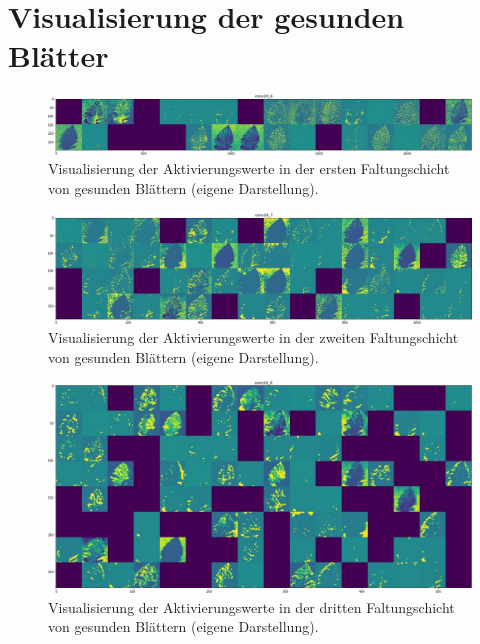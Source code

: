 \chapter{Visualisierung der gesunden Blätter}
\label{anahnga}


\begin{figure}[h!]
	\centering
	\includegraphics[width=\textwidth]{visualisierungen/healthy/activation/healthy0.JPG}
	\caption{Visualisierung der Aktivierungswerte in der ersten Faltungschicht von gesunden Blättern (eigene Darstellung).}
	\label{}
\end{figure}

\begin{figure}[h!]
	\centering
	\includegraphics[width=\textwidth]{visualisierungen/healthy/activation/healthy3.JPG}
	\caption{Visualisierung der Aktivierungswerte in der zweiten Faltungschicht von gesunden Blättern (eigene Darstellung).}
	\label{}
\end{figure}

\begin{figure}[h!]
	\centering
	\includegraphics[width=\textwidth]{visualisierungen/healthy/activation/healthy6.JPG}
	\caption{Visualisierung der Aktivierungswerte in der dritten Faltungschicht von gesunden Blättern (eigene Darstellung).}
	\label{}
\end{figure}

